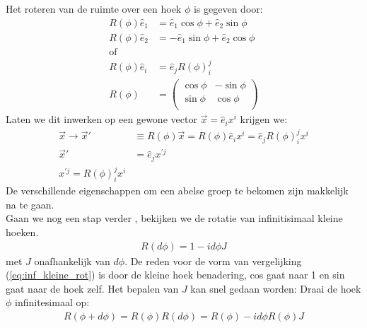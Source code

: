 \documentclass[../main.tex]{subfiles}
\begin{document}
Het roteren van de ruimte over een hoek $\phi$ is gegeven door:
\begin{equation}
    \begin{aligned}
        \label{eq:rotatie}
        R(\phi)\hat{e}_1 &= \hat{e}_1 \cos{\phi} + \hat{e}_2 \sin{\phi}\\
        R(\phi)\hat{e}_2 &= -\hat{e}_1 \sin{\phi} + \hat{e}_2 \cos{\phi}\\
        \text{of}\\
        R(\phi)\hat{e}_i &= \hat{e}_jR(\phi)_i^j\\
        R(\phi)&=
        \begin{pmatrix}
            \cos\phi & -\sin\phi\\
            \sin\phi & \cos\phi\\
        \end{pmatrix}
    \end{aligned}
\end{equation}
Laten we dit inwerken op een gewone vector $\vec{x}=\hat{e}_ix^i$ krijgen we:
\begin{equation}
    \begin{aligned}
        \label{eq:rot_vec}
        \vec{x}\rightarrow\vec{x}' &\equiv R(\phi)\vec{x}=R(\phi)\hat{e}_ix^i = \hat{e}_jR(\phi)_i^jx^i\\
        \vec{x}' &= \hat{e}_jx^{'j}\\
        x^{'j}=R(\phi)_i^jx^i
    \end{aligned}
\end{equation}
De verschillende eigenschappen om een abelse groep te bekomen zijn makkelijk na te gaan.\\
Gaan we nog een stap verder , bekijken we de rotatie van infinitisimaal kleine hoeken.
\begin{equation}
    \begin{aligned}
        \label{eq:inf_kleine_rot}
        R(d\phi)=1-id\phi J
    \end{aligned}
\end{equation}
met $J$ onafhankelijk van $d\phi$. De reden voor de vorm van vergelijking (\ref{eq:inf_kleine_rot}) is door de kleine hoek benadering, cos gaat naar 1 en sin gaat naar de hoek zelf. Het bepalen van $J$ kan snel gedaan worden:
Draai de hoek $\phi$ infinitesimaal op:
\begin{equation}
    \begin{aligned}
        \label{eq:bepalen_J_1}
        R(\phi+d\phi) = R(\phi)R(d\phi)=R(\phi)-id\phi R(\phi)J
    \end{aligned}
\end{equation}
\end{document}
